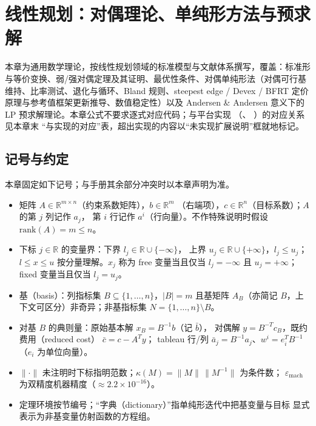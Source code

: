 
\section{线性规划：对偶理论、单纯形方法与预求解}\label{sec:thlp}

\begin{theorynote}
本章为通用数学理论，按线性规划领域的标准模型与文献体系撰写，覆盖：标准形
与等价变换、弱/强对偶定理及其证明、最优性条件、对偶单纯形法（对偶可行基
维持、比率测试、退化与循环、Bland 规则、steepest edge / Devex / BFRT 定价
原理与参考值框架更新推导、数值稳定性）以及 Andersen \& Andersen 意义下的
LP 预求解理论。本章公式不要求逐式对应代码；与平台实现
（、
）的对应关系见本章末
``与实现的对应''表，超出实现的内容以``未实现扩展说明''框就地标记。
\end{theorynote}

\subsection{记号与约定}\label{subsec:thlp-notation}

本章固定如下记号；与手册其余部分冲突时以本章声明为准。

\begin{itemize}
  \item 矩阵 $A\in\mathbb{R}^{m\times n}$（约束系数矩阵），$b\in\mathbb{R}^m$
        （右端项），$c\in\mathbb{R}^n$（目标系数）；$A$ 的第 $j$ 列记作 $a_j$，
        第 $i$ 行记作 $a^i$（行向量）。不作特殊说明时假设 $\mathrm{rank}(A)=m\le n$。
  \item 下标 $j\in\mathbb{R}$ 的变量界：下界 $l_j\in\mathbb{R}\cup\{-\infty\}$，
        上界 $u_j\in\mathbb{R}\cup\{+\infty\}$，$l_j\le u_j$；
        $l\le x\le u$ 按分量理解。$x_j$ 称为 free 变量当且仅当
        $l_j=-\infty$ 且 $u_j=+\infty$；fixed 变量当且仅当 $l_j=u_j$。
  \item 基（basis）：列指标集 $B\subseteq\{1,\dots,n\}$，$|B|=m$ 且基矩阵
        $A_B$（亦简记 $B$，上下文可区分）非奇异；非基指标集
        $N=\{1,\dots,n\}\setminus B$。
  \item 对基 $B$ 的典则量：原始基本解 $x_B=B^{-1}b$（记 $\bar b$），
        对偶解 $y=B^{-T}c_B$，既约费用（reduced cost）
        $\bar c=c-A^{T}y$； tableau 行/列
        $\bar a_j=B^{-1}a_j$、$w^i=e_i^{T}B^{-1}$（$e_i$ 为单位向量）。
  \item $\|\cdot\|$ 未注明时下标指明范数；$\kappa(M)=\|M\|\,\|M^{-1}\|$ 为条件数；
        $\varepsilon_{\mathrm{mach}}$ 为双精度机器精度（$\approx 2.2\times10^{-16}$）。
  \item 定理环境按节编号；``字典（dictionary）''指单纯形迭代中把基变量与目标
        显式表示为非基变量仿射函数的方程组。
\end{itemize}

